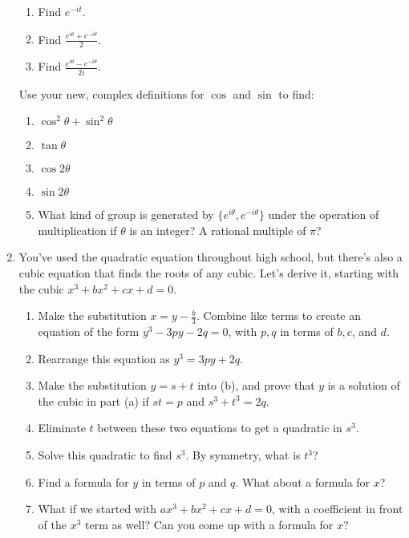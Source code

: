 \documentclass[../gatm.tex]{subfiles}
\begin{document}
\begin{enumerate}
\begin{multicols}{3}
\begin{enumerate}
\item Find $e^{-it}$.
\item Find $\frac{e^{i\theta} + e^{-i\theta}}{2}$.
\item Find $\frac{e^{i\theta} - e^{-i\theta}}{2i}$.
\setcounter{cg_problem_ii}{\value{enumii}}
\end{enumerate}
\end{multicols}
Use your new, complex definitions for $\cos$ and $\sin$ to find:%
\begin{multicols}{2}
\begin{enumerate}
\setcounter{enumii}{\value{cg_problem_ii}}
\item $\cos^2\theta + \sin^2\theta$
\item $\tan\theta$
\item $\cos 2\theta$
\item $\sin 2\theta$
\item What kind of group is generated by $\{ e^{i\theta}, e^{-i\theta}\}$ under the operation of multiplication if $\theta$ is an integer? A rational multiple of $\pi$?
\end{enumerate}
\end{multicols}
\item You've used the quadratic equation throughout high school, but there's also a cubic equation that finds the roots of any cubic. Let's derive it, starting with the cubic $x^3+bx^2+cx+d=0$.
\begin{enumerate}
\item Make the substitution $x=y-\frac{b}{3}$. Combine like terms to create an equation of the form $y^3-3py-2q=0$, with $p,q$ in terms of $b,c$, and $d$.
\item Rearrange this equation as $y^3=3py+2q$.
\item Make the substitution $y=s+t$ into (b), and prove that $y$ is a solution of the cubic in part (a) if $st=p$ and $s^3+t^3=2q$.
\item Eliminate $t$ between these two equations to get a quadratic in $s^3$.
\item Solve this quadratic to find $s^3$. By symmetry, what is $t^3$?
\item Find a formula for $y$ in terms of $p$ and $q$. What about a formula for $x$?
\item What if we started with $ax^3+bx^2+cx+d=0$, with a coefficient in front of the $x^3$ term as well? Can you come up with a formula for $x$?

\end{enumerate}
\end{enumerate}
\end{document}
